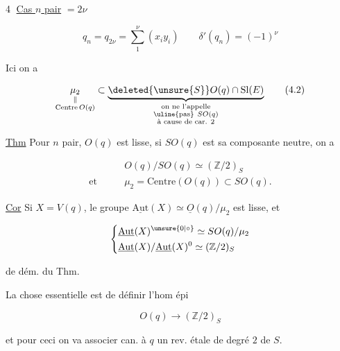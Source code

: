 
\textcircled{4} \uline{Cas $n$ pair} $=2\nu$

\[
 q_n=q_{2\nu}=\sum_1^\nu(x_i y_i)\qquad \delta'(q_n)=(-1)^\nu\tag*{(4.1)}
\]

 Ici on a

\[
 \underset{\substack{\parallel\\\mathrm{Centre}\,O(q)}}{\mu_2}
 \subset\underbrace{\deleted{\unsure{S}}O(q)\cap\mathrm{Sl}(E)}_{
 \substack{\text{on ne l'appelle}\\\text{\uline{pas}}\ SO(q)\\\text{à cause de car. }2}}
 \tag*{(4.2)}
\]


\uline{Thm} Pour $n$ pair, $O(q)$ est lisse, si $SO(q)$ est sa composante neutre, on a

\[
 \begin{aligned}
 &O(q)/SO(q)\simeq(\mathbb Z/2)_S\\
 \text{et}\qquad &\mu_2=\mathrm{Centre}(O(q))\subset SO(q).
 \end{aligned}
\]

\uline{Cor} Si $X=V(q)$, le groupe $\underline{\mathrm{Aut}}(X)\simeq\underline O(q)/\mu_2$ est lisse, et

\[
 \left\{\begin{aligned}
 &\underline{\mathrm{Aut}}(X)^{\unsure{0|\circ}}\simeq SO(q)/\mu_2\\
 &\underline{\mathrm{Aut}}(X)/\underline{\mathrm{Aut}}(X)^0\simeq(\mathbb Z/2)_S
 \end{aligned}\right.
\]

 de dém. du Thm.

La chose essentielle est de définir l'hom  épi

\[
 O(q)\longrightarrow(\mathbb Z/2)_S
\]

et pour ceci on va associer can. à $q$ un rev. étale de degré $2$ de $S$.

